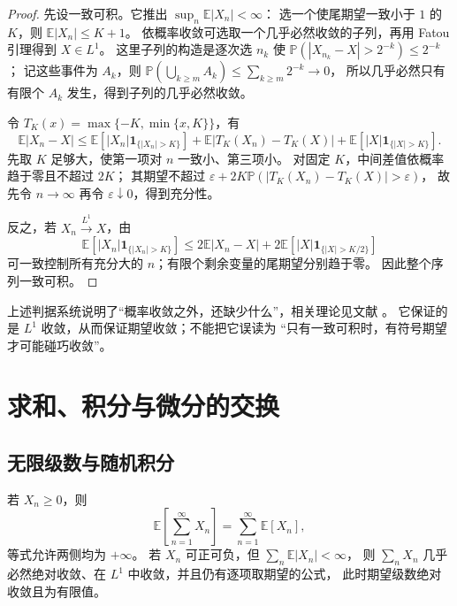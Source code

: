 \documentclass[UTF8,12pt,a4paper,fontset=fandol]{ctexart}
\begin{document}
\begin{proof}
先设一致可积。它推出 $\sup_n\mathbb E|X_n|<\infty$：
选一个使尾期望一致小于 $1$ 的 $K$，则 $\mathbb E|X_n|\leq K+1$。
依概率收敛可选取一个几乎必然收敛的子列，再用 Fatou 引理得到 $X\in L^1$。
这里子列的构造是逐次选 $n_k$ 使
$\mathbb P(|X_{n_k}-X|>2^{-k})\leq2^{-k}$；
记这些事件为 $A_k$，则
$\mathbb P(\bigcup_{k\geq m}A_k)\leq\sum_{k\geq m}2^{-k}\to0$，
所以几乎必然只有有限个 $A_k$ 发生，得到子列的几乎必然收敛。

令 $T_K(x)=\max\{-K,\min\{x,K\}\}$，有
\[
  \mathbb E|X_n-X|
  \leq\mathbb E[|X_n|\mathbf1_{\{|X_n|>K\}}]
  +\mathbb E|T_K(X_n)-T_K(X)|
  +\mathbb E[|X|\mathbf1_{\{|X|>K\}}].
\]
先取 $K$ 足够大，使第一项对 $n$ 一致小、第三项小。
对固定 $K$，中间差值依概率趋于零且不超过 $2K$；
其期望不超过 $\varepsilon+2K\mathbb P(|T_K(X_n)-T_K(X)|>\varepsilon)$，
故先令 $n\to\infty$ 再令 $\varepsilon\downarrow0$，得到充分性。

反之，若 $X_n\xrightarrow{L^1}X$，由
\[
  \mathbb E[|X_n|\mathbf1_{\{|X_n|>K\}}]
  \leq2\mathbb E|X_n-X|
    +2\mathbb E[|X|\mathbf1_{\{|X|>K/2\}}]
\]
可一致控制所有充分大的 $n$；有限个剩余变量的尾期望分别趋于零。
因此整个序列一致可积。
\end{proof}

上述判据系统说明了“概率收敛之外，还缺少什么”，相关理论见文献 \cite[第 4.6 节]{durrett-pte}。
它保证的是 $L^1$ 收敛，从而保证期望收敛；不能把它误读为
“只有一致可积时，有符号期望才可能碰巧收敛”。

\section{求和、积分与微分的交换}
\label{sec:expectation-exchange}

\subsection{无限级数与随机积分}

\begin{proposition}[无限和的两种充分条件]
\label{prop:expectation-series}
若 $X_n\geq0$，则
\begin{equation}
  \mathbb E\!\left[\sum_{n=1}^\infty X_n\right]
  =\sum_{n=1}^\infty\mathbb E[X_n],
  \label{eq:expectation-positive-series}
\end{equation}
等式允许两侧均为 $+\infty$。
若 $X_n$ 可正可负，但 $\sum_n\mathbb E|X_n|<\infty$，
则 $\sum_nX_n$ 几乎必然绝对收敛、在 $L^1$ 中收敛，并且仍有逐项取期望的公式，
此时期望级数绝对收敛且为有限值。
\end{proposition}
\end{document}
